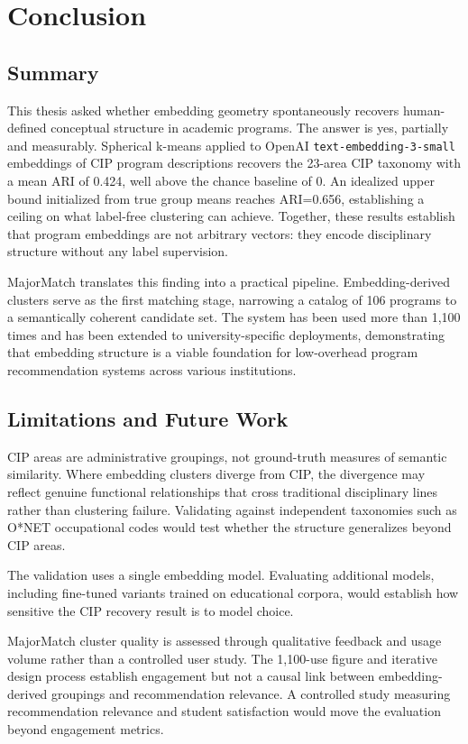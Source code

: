 
\chapter{Conclusion}

\section{Summary}

This thesis asked whether embedding geometry spontaneously recovers human-defined conceptual structure in academic programs. The answer is yes, partially and measurably. Spherical k-means applied to OpenAI \texttt{text-embedding-3-small} embeddings of CIP program descriptions recovers the 23-area CIP taxonomy with a mean ARI of 0.424, well above the chance baseline of 0. An idealized upper bound initialized from true group means reaches ARI=0.656, establishing a ceiling on what label-free clustering can achieve. Together, these results establish that program embeddings are not arbitrary vectors: they encode disciplinary structure without any label supervision.

MajorMatch translates this finding into a practical pipeline. Embedding-derived clusters serve as the first matching stage, narrowing a catalog of 106 programs to a semantically coherent candidate set. The system has been used more than 1,100 times and has been extended to university-specific deployments, demonstrating that embedding structure is a viable foundation for low-overhead program recommendation systems across various institutions.

\section{Limitations and Future Work}

CIP areas are administrative groupings, not ground-truth measures of semantic similarity. Where embedding clusters diverge from CIP, the divergence may reflect genuine functional relationships that cross traditional disciplinary lines rather than clustering failure. Validating against independent taxonomies such as O*NET occupational codes would test whether the structure generalizes beyond CIP areas.

The validation uses a single embedding model. Evaluating additional models, including fine-tuned variants trained on educational corpora, would establish how sensitive the CIP recovery result is to model choice.

MajorMatch cluster quality is assessed through qualitative feedback and usage volume rather than a controlled user study. The 1,100-use figure and iterative design process establish engagement but not a causal link between embedding-derived groupings and recommendation relevance. A controlled study measuring recommendation relevance and student satisfaction would move the evaluation beyond engagement metrics.

\newpage

